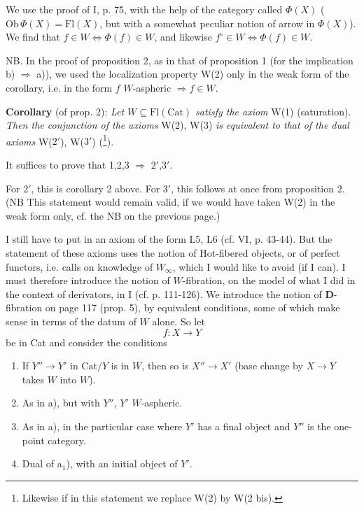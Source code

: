 \documentclass[11pt]{article}
\newcommand{\printedpage}[1]{\marginpar{\footnotesize p.~#1}}
\newcommand{\msp}[1]{\marginpar{\footnotesize [#1]}}
\begin{document}
\printedpage{4}
We use the proof of I, p. 75, with the help of the category called $\Phi(X)$ ($\mathrm{Ob}\,\Phi(X) = \mathrm{Fl}(X)$, but with a somewhat peculiar notion of arrow in $\Phi(X)$). We find that $f \in W \iff \Phi(f) \in W$, and likewise $f^\circ \in W \iff \Phi(f) \in W$.

NB. In the proof of proposition 2, as in that of proposition 1 (for the implication b) $\Longrightarrow$ a)), we used the localization property W(2) only in the weak form of the corollary, i.e. in the form $f$ $W$-aspheric $\Longrightarrow f \in W$.

\textbf{Corollary} (of prop. 2): \textit{Let $W \subseteq \mathrm{Fl}(\mathrm{Cat})$ satisfy the axiom} W(1) (saturation). \textit{Then the conjunction of the axioms} W(2), W(3) \textit{is equivalent to that of the dual axioms} W($2'$), W($3'$) (\footnote[5]{Likewise if in this statement we replace W(2) by W(2 bis).}).

It suffices to prove that 1,2,3 $\Longrightarrow$ $2'$,$3'$.

\msp{page 4}

For $2'$, this is corollary 2 above. For $3'$, this follows at once from proposition 2. (NB This statement would remain valid, if we would have taken W(2) in the weak form only, cf. the NB on the previous page.)

I still have to put in an axiom of the form L5, L6 (cf. VI, p. 43-44). But the statement of these axioms uses the notion of Hot-fibered objects, or of perfect functors, i.e. calls on knowledge of $W_\infty$, which I would like to avoid (if I can). I must therefore introduce the notion of $W$-fibration, on the model of what I did in the context of derivators, in I (cf. p. 111-126). We introduce the notion of \textbf{D}-fibration on page 117 (prop. 5), by equivalent conditions, some of which make sense in terms of the datum of $W$ alone. So let
\[ f : X \longrightarrow Y \]
be in Cat and consider the conditions

\begin{enumerate}
\item[a)] If $Y'' \longrightarrow Y'$ in $\mathrm{Cat}/Y$ is in $W$, then so is $X'' \longrightarrow X'$ (base change by $X \longrightarrow Y$ takes $W$ into $W$).
\item[a$'$)] As in a), but with $Y''$, $Y'$ $W$-aspheric.
\item[a$_1$)] As in a), in the particular case where $Y'$ has a final object and $Y''$ is the one-point category.
\item[a$_2$)] Dual of a$_1$), with an initial object of $Y'$.
\end{enumerate}
\end{document}
